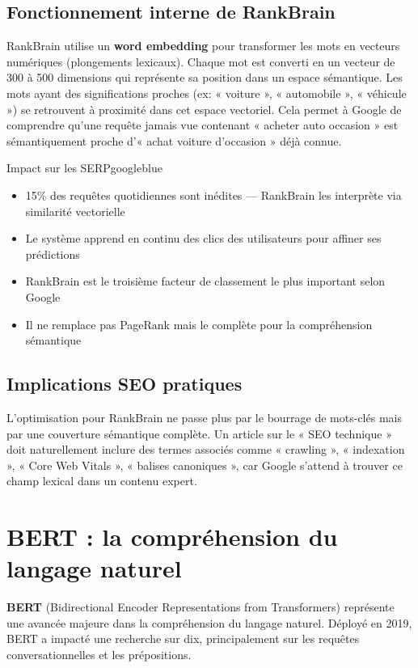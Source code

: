 \documentclass[12pt,a4paper,twoside]{report}
\newcommand{\keyword}[1]{\textbf{\textcolor{googleblue}{#1}}}
\begin{document}
\subsection{Fonctionnement interne de RankBrain}

RankBrain utilise un \keyword{word embedding} pour transformer les mots en vecteurs numériques (plongements lexicaux). Chaque mot est converti en un vecteur de 300 à 500 dimensions qui représente sa position dans un espace sémantique. Les mots ayant des significations proches (ex: « voiture », « automobile », « véhicule ») se retrouvent à proximité dans cet espace vectoriel. Cela permet à Google de comprendre qu'une requête jamais vue contenant « acheter auto occasion » est sémantiquement proche d'« achat voiture d'occasion » déjà connue.

\begin{mybox}{Impact sur les SERP}{googleblue}
\begin{itemize}
    \item 15\% des requêtes quotidiennes sont inédites — RankBrain les interprète via similarité vectorielle
    \item Le système apprend en continu des clics des utilisateurs pour affiner ses prédictions
    \item RankBrain est le troisième facteur de classement le plus important selon Google
    \item Il ne remplace pas PageRank mais le complète pour la compréhension sémantique
\end{itemize}
\end{mybox}

\subsection{Implications SEO pratiques}

L'optimisation pour RankBrain ne passe plus par le bourrage de mots-clés mais par une couverture sémantique complète. Un article sur le « SEO technique » doit naturellement inclure des termes associés comme « crawling », « indexation », « Core Web Vitals », « balises canoniques », car Google s'attend à trouver ce champ lexical dans un contenu expert.

\section{BERT : la compréhension du langage naturel}

\keyword{BERT} (Bidirectional Encoder Representations from Transformers) représente une avancée majeure dans la compréhension du langage naturel. Déployé en 2019, BERT a impacté une recherche sur dix, principalement sur les requêtes conversationnelles et les prépositions.
\end{document}
